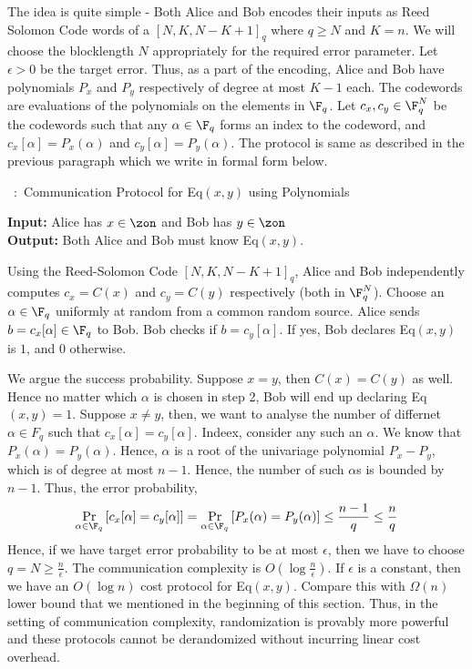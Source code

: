 The idea is quite simple - Both Alice and Bob encodes their inputs as Reed Solomon Code words of a $[N,K,N-K+1]_q$ where $q \ge N$ and $K=n$. We will choose the blocklength $N$ appropriately for the required error parameter. Let $\epsilon > 0$ be the target error. Thus, as a part of the encoding, Alice and Bob have polynomials $P_x$ and $P_y$ respectively of degree at most $K-1$ each. The codewords are evaluations of the polynomials on the elements in $\F_q$. Let $c_x, c_y \in \F_q^N$ be the codewords such that any $\alpha \in \F_q$ forms an index to the codeword, and $c_x[\alpha] = P_x(\alpha)$ and $c_y[\alpha] = P_y(\alpha)$.
The protocol is same as described in the previous paragraph which we write in formal form below.

\begin{algorithm}
\label{alg:communication-complexity}
\caption{~:~Communication Protocol for {\sc Eq}$(x,y)$ using Polynomials}
{\bf Input:} Alice has $x \in \zon$ and Bob has $y \in\zon$ \\
{\bf Output: } Both Alice and Bob must know {\sc Eq}$(x,y)$.
\begin{algorithmic}[1]
\State Using the Reed-Solomon Code $[N,K,N-K+1]_q$, Alice and Bob independently computes $c_x = C(x)$ and $c_y = C(y)$ respectively (both in $\F_q^N$).
\State Choose an $\alpha \in \F_q$ uniformly at random from a common random source.
\State Alice sends $b = c_x[\alpha] \in \F_q$ to Bob. Bob checks if $b = c_y[\alpha]$. If yes, Bob declares {\sc Eq}$(x,y)$ is $1$, and $0$ otherwise.
\end{algorithmic}
\end{algorithm}

We argue the success probability. Suppose $x = y$, then $C(x) = C(y)$ as well. Hence no matter which $\alpha$ is chosen in step 2, Bob will end up declaring {\sc Eq}$(x,y) = 1$. Suppose $x \ne y$, then, we want to analyse the number of differnet $\alpha \in F_q$ such that $c_x[\alpha] = c_y[\alpha]$. Indeex, consider any such an $\alpha$. We know that $P_x(\alpha) = P_y(\alpha)$. Hence, $\alpha$ is a root of the univariage polynomial $P_x - P_y$, which is of degree at most $n-1$. Hence, the number of such $\alpha$s is bounded by $n-1$. Thus, the error probability,
$$\Pr_{\alpha \in \F_q} \left[c_x[\alpha] = c_y[\alpha]\right] = \Pr_{\alpha \in \F_q} \left[P_x(\alpha) = P_y(\alpha) \right] \le \frac{n-1}{q} \le \frac{n}{q}$$
Hence, if we have target error probability to be at most $\epsilon$, then we have to choose $q=N \ge \frac{n}{\epsilon}$. The communication complexity is $O(\log \frac{n}{\epsilon})$. If $\epsilon$ is a constant, then we have an $O(\log n)$ cost protocol for {\sc Eq}$(x,y)$. Compare this with $\Omega(n)$ lower bound that we mentioned in the beginning of this section. Thus, in the setting of communication complexity, randomization is provably more powerful and these protocols cannot be derandomized without incurring linear cost overhead.

